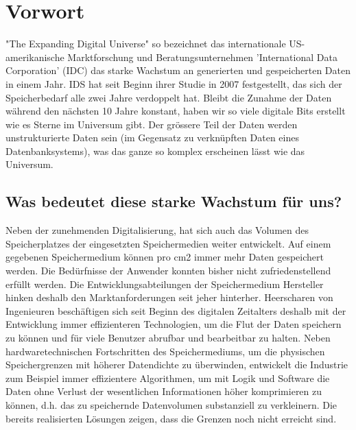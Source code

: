 
\cleardoublepage
\chapter{Vorwort}
"The Expanding Digital Universe" so bezeichnet das internationale US-amerikanische Marktforschung und Beratungsunternehmen 'International Data Corporation' (IDC) das starke Wachstum an generierten und gespeicherten Daten in einem Jahr. IDS hat seit Beginn ihrer Studie in 2007 festgestellt, das sich der Speicherbedarf alle zwei Jahre verdoppelt hat. Bleibt die Zunahme der Daten während den nächsten 10 Jahre konstant, haben wir so viele digitale Bits erstellt wie es Sterne im Universum gibt. Der grössere Teil der Daten werden unstrukturierte Daten sein (im Gegensatz zu verknüpften Daten eines Datenbanksystems), was das ganze so komplex erscheinen lässt wie das Universum. \cite{Gantz2011}

\section{Was bedeutet diese starke Wachstum für uns?}
Neben der zunehmenden Digitalisierung, hat sich auch das Volumen des Speicherplatzes der eingesetzten Speichermedien weiter entwickelt. Auf einem gegebenen Speichermedium können pro cm2 immer mehr Daten gespeichert werden. Die Bedürfnisse der Anwender konnten bisher nicht zufriedenstellend erfüllt werden. Die Entwicklungsabteilungen der Speichermedium Hersteller hinken deshalb den Marktanforderungen seit jeher hinterher. Heerscharen von Ingenieuren beschäftigen sich seit Beginn des digitalen Zeitalters deshalb mit der Entwicklung immer effizienteren Technologien, um die Flut der Daten speichern zu können und für viele Benutzer abrufbar und bearbeitbar zu halten. Neben hardwaretechnischen Fortschritten des Speichermediums, um die physischen Speichergrenzen mit höherer Datendichte zu überwinden, entwickelt die Industrie zum Beispiel immer effizientere Algorithmen, um mit Logik und Software die Daten ohne Verlust der wesentlichen Informationen höher komprimieren zu können, d.h. das zu speichernde Datenvolumen substanziell zu verkleinern. Die bereits realisierten Lösungen zeigen, dass die Grenzen noch nicht erreicht sind.


